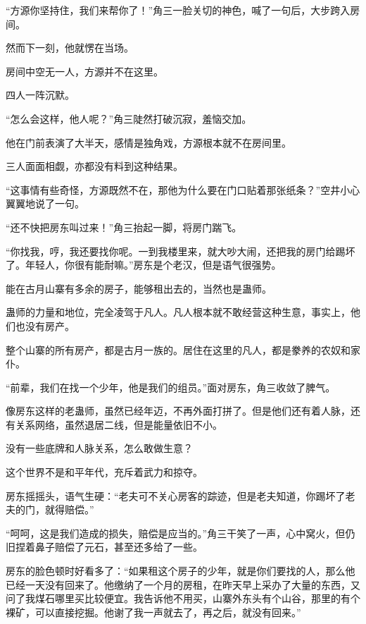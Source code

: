 
\begin{this_body}

“方源你坚持住，我们来帮你了！”角三一脸关切的神色，喊了一句后，大步跨入房间。

然而下一刻，他就愣在当场。

房间中空无一人，方源并不在这里。

四人一阵沉默。

“怎么会这样，他人呢？”角三陡然打破沉寂，羞恼交加。

他在门前表演了大半天，感情是独角戏，方源根本就不在房间里。

三人面面相觑，亦都没有料到这种结果。

“这事情有些奇怪，方源既然不在，那他为什么要在门口贴着那张纸条？”空井小心翼翼地说了一句。

“还不快把房东叫过来！”角三抬起一脚，将房门踹飞。

“你找我，哼，我还要找你呢。一到我楼里来，就大吵大闹，还把我的房门给踢坏了。年轻人，你很有能耐嘛。”房东是个老汉，但是语气很强势。

能在古月山寨有多余的房子，能够租出去的，当然也是蛊师。

蛊师的力量和地位，完全凌驾于凡人。凡人根本就不敢经营这种生意，事实上，他们也没有房产。

整个山寨的所有房产，都是古月一族的。居住在这里的凡人，都是豢养的农奴和家仆。

“前辈，我们在找一个少年，他是我们的组员。”面对房东，角三收敛了脾气。

像房东这样的老蛊师，虽然已经年迈，不再外面打拼了。但是他们还有着人脉，还有关系网络，虽然退居二线，但是能量依旧不小。

没有一些底牌和人脉关系，怎么敢做生意？

这个世界不是和平年代，充斥着武力和掠夺。

房东摇摇头，语气生硬：“老夫可不关心房客的踪迹，但是老夫知道，你踢坏了老夫的门，就得赔偿。”

“呵呵，这是我们造成的损失，赔偿是应当的。”角三干笑了一声，心中窝火，但仍旧捏着鼻子赔偿了元石，甚至还多给了一些。

房东的脸色顿时好看多了：“如果租这个房子的少年，就是你们要找的人，那么他已经一天没有回来了。他缴纳了一个月的房租，在昨天早上采办了大量的东西，又问了我煤石哪里买比较便宜。我告诉他不用买，山寨外东头有个山谷，那里的有个裸矿，可以直接挖掘。他谢了我一声就去了，再之后，就没有回来。”


\end{this_body}
